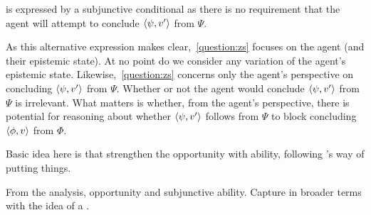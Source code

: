 {
  \color{blue} \requ{} is expressed by a subjunctive conditional as there is no requirement that the agent will attempt to conclude \(\langle \psi, v' \rangle\) from \(\Psi\).

  \color{red}
  As this alternative expression makes clear,~\autoref{question:zs} focuses on the agent (and their epistemic state).
  At no point do we consider any variation of the agent's epistemic state.
  Likewise,~\autoref{question:zs} concerns only the agent's perspective on concluding \(\langle \psi, v' \rangle\) from \(\Psi\).
  Whether or not the agent would conclude \(\langle \psi, v' \rangle\) from \(\Psi\) is irrelevant.
  What matters is whether, from the agent's perspective, there is potential for reasoning about whether \(\langle \psi, v' \rangle\) follows from \(\Psi\) to block concluding \(\langle \phi, v \rangle\) from \(\Phi\).
}

\begin{note}
  \color{red}
  Basic idea here is that strengthen the opportunity with ability, following \citeauthor{Austin:1961vz}'s way of putting things.
\end{note}

\begin{note}
  \color{red}
  From the analysis, opportunity and subjunctive ability.
  Capture in broader terms with the idea of a \requ{}.
\end{note}

